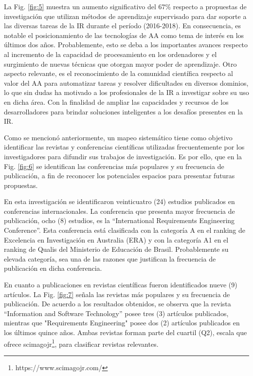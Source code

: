 \documentclass[journal]{IEEEtran}
\begin{document}
La Fig. \ref{fig:5} muestra un aumento significativo del 67\% respecto a propuestas de investigación que utilizan métodos de aprendizaje supervisado para dar soporte a las diversas tareas de la IR durante el período (2016-2018). En consecuencia, es notable el posicionamiento de las tecnologías de AA como tema de interés en los últimos dos años. Probablemente, esto se deba a los importantes avances respecto al incremento de la capacidad de procesamiento en los ordenadores y el surgimiento de nuevas técnicas que otorgan mayor poder de aprendizaje. Otro aspecto relevante, es el reconocimiento de la comunidad científica respecto al valor del AA para automatizar tareas y resolver dificultades en diversos dominios, lo que sin dudas ha motivado a los profesionales de la IR a investigar sobre su uso en dicha área. Con la finalidad de ampliar las capacidades y recursos de los desarrolladores para brindar soluciones inteligentes a los desafíos presentes en la IR. 

Como se mencionó anteriormente, un mapeo sistemático tiene como objetivo identificar las revistas y conferencias científicas utilizadas frecuentemente por los investigadores para difundir sus trabajos de investigación. Es por ello, que en la Fig. \ref{fig:6} se identifican las conferencias más populares y su frecuencia de publicación, a fin de reconocer los potenciales espacios para presentar futuras propuestas. 

En esta investigación se identificaron veinticuatro (24) estudios publicados en conferencias internacionales. La conferencia que presenta mayor frecuencia de publicación, ocho (8) estudios, es la “International Requirements Engineering Conference”. Esta conferencia está clasificada con la categoría A en el ranking de Excelencia en Investigación en Australia (ERA) y con la categoría A1 en el ranking de Qualis del Ministerio de Educación de Brasil. Probablemente su elevada categoría, sea una de las razones que justifican la frecuencia de publicación en dicha conferencia. 

En cuanto a publicaciones en revistas científicas fueron identificados nueve (9) artículos. La Fig. \ref{fig:7} señala las revistas más populares y su frecuencia de publicación. De acuerdo a los resultados obtenidos, se observa que la revista “Information and Software Technology” posee tres (3) artículos publicados, mientras que "Requirements Engineering" posee dos (2) artículos publicados en los últimos quince años. Ambas revistas forman parte del cuartil (Q2), escala que ofrece scimagojr\footnote{https://www.scimagojr.com/}, para clasificar revistas relevantes. 
\end{document}
